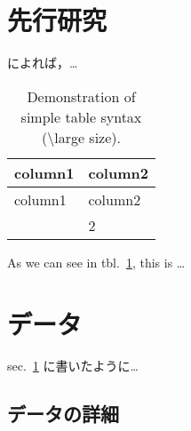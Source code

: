 \documentclass[
  b5paper,
  10pt,
  draft]{ltjsarticle}
\begin{document}
\hypertarget{sec:previous_research}{%
\section{先行研究}\label{sec:previous_research}}

\lipsum[1-4]

\autocite{benjamin_reconstructing_2012,hodoscek_readability_2012,dubay_smart_2007,pitler_revisiting_2008,sato_automatic_2008,Sato2008}

\textcite{shibasaki_japanese_2010} によれば，\ldots{}

\large

\hypertarget{tbl:my_table}{}
\begin{longtable}[]{@{}ll@{}}
\caption{\label{tbl:my_table}Demonstration of simple table syntax
(\textbackslash large size).}\tabularnewline
\toprule\noalign{}
column1 & column2 \\
\midrule\noalign{}
\endfirsthead
\toprule\noalign{}
column1 & column2 \\
\midrule\noalign{}
\endhead
\bottomrule\noalign{}
\endlastfoot
1 & 2 \\
\end{longtable}

\normalsize

As we can see in tbl.~\ref{tbl:my_table}, this is \ldots{}

\hypertarget{ux30c7ux30fcux30bf}{%
\section{データ}\label{ux30c7ux30fcux30bf}}

sec.~\ref{sec:previous_research} に書いたように\ldots{}

\lipsum[1-4]

\hypertarget{ux30c7ux30fcux30bfux306eux8a73ux7d30}{%
\subsection{データの詳細}\label{ux30c7ux30fcux30bfux306eux8a73ux7d30}}
\end{document}
